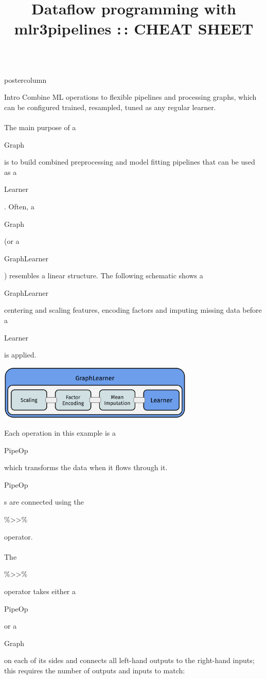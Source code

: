 \documentclass{beamer}
\title{Dataflow programming with mlr3pipelines :\,: CHEAT SHEET} %
\newlength{\columnheight} %
\newcommand{\codeinline}[1]{\begin{codeboxinline}#1\end{codeboxinline}}
\begin{document}
\begin{frame}[fragile]{}
	\begin{columns}
		\begin{column}{.245\textwidth}
			\begin{beamercolorbox}[center]{postercolumn}
				\begin{minipage}{.98\textwidth}
					\parbox[t][\columnheight]{\textwidth}{
						\begin{myblock}{Intro}
              \vspace{-0.5em}
              Combine ML operations to flexible pipelines and processing graphs, which can be configured trained, resampled, tuned as any regular learner.\\
              \ \\
              The main purpose of a \codeinline{Graph} is to build combined preprocessing and model fitting pipelines that can be used as a \codeinline{Learner}. Often, a \codeinline{Graph} (or a \codeinline{GraphLearner}) resembles a linear structure. The following schematic shows a \codeinline{GraphLearner} centering and scaling features, encoding factors and imputing missing data before a \codeinline{Learner} is applied.
              \begin{center}
                \includegraphics[width=0.7\textwidth]{img/grl_linear.pdf}
              \end{center}
              Each operation in this example is a \codeinline{PipeOp} which transforms the data when it flows through it. \codeinline{PipeOp}s are connected using the \codeinline{\%>{}>\%} operator.\\
              \ \\
            The \codeinline{\%>{}>\%} operator takes either a \codeinline{PipeOp} or a \codeinline{Graph} on each of its sides and connects all left-hand outputs to the right-hand inputs; this requires the number of outputs and inputs to match:
              \begin{codebox}

\end{codebox}
\end{myblock}}
\end{minipage}
\end{beamercolorbox}
\end{column}
\end{columns}
\end{frame}
\end{document}
